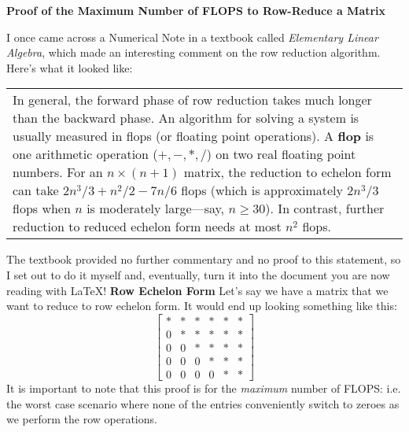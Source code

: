 \documentclass{article}
\begin{document}
\begin{center}
\LARGE{\bf{Proof of the Maximum Number of FLOPS to Row-Reduce a Matrix}}
\author{Ivan Mladenov}
\end{center}
I once came across a Numerical Note in a textbook called {\it{Elementary Linear Algebra}}, which made an interesting comment on the row reduction algorithm. Here's what it looked like:
\newline
\newline
\begin{tabular}{|p{11cm}}
In general, the forward phase of row reduction takes much longer than the backward phase. An algorithm for solving a system is usually measured in flops (or floating point operations). A {\bf{flop}} is one arithmetic operation ($+,-,*,/$) on two real floating point numbers. For an $n\times (n+1)$ matrix, the reduction to echelon form can take $2n^3/3+n^2/2-7n/6$ flops (which is approximately $2n^3/3$ flops when $n$ is moderately large---say, $n\ge 30$). In contrast, further reduction to reduced echelon form needs at most $n^2$ flops.
\end{tabular}
\newline
\newline
\newline
The textbook provided no further commentary and no proof to this statement, so I set out to do it myself and, eventually, turn it into the document you are now reading with \LaTeX! 
\newline
\newline
{\Large{\bf{Row Echelon Form}}}
\newline
\newline
Let's say we have a matrix that we want to reduce to row echelon form. It would end up looking something like this:
\newline
\[
\begin{bmatrix}
* & * & * & * & * & * \\
0 & * & * & * & * & * \\
0 & 0 & * & * & * & * \\
0 & 0 & 0 & * & * & * \\
0 & 0 & 0 & 0 & * & * 
\end{bmatrix}
\]
\newline
\newline
It is important to note that this proof is for the \emph{maximum} number of FLOPS: i.e. the worst case scenario where none of the entries conveniently switch to zeroes as we perform the row operations. 
\newline
\end{document}
